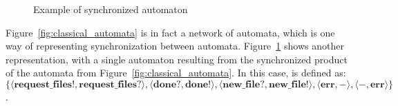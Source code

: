 \iffalse
\begin{definition}[Synchronized Automata Semantics]
A valid transition for $\automatasystem{}_s$ is then defined as:
$\automatanext{}(\langle \automatastate{}, \automataenvironment{}\rangle)
\triangleq \{\langle \automatastate{}', \automataenvironment{}'\rangle
|
   \existsin{\langle \automatastate{}, c, l, a, \automatastate{}' \rangle}{%
      \automatarelations{}_s}{%
      (\llbracket{}c\rrbracket_{\automataenvironment{}} = true)
      \land (\automataenvironment{}' = \llbracket{}a\rrbracket_{\automataenvironment{}})
      \land l \in \automatasyncconstraint{}
   }\}
$
\end{definition}
\fi
\begin{figure}[hbt!]
   \centering
   
   \caption{Example of synchronized automaton}
   \label{fig:classical_synchronized_automaton}
\end{figure}

\begin{example}
Figure~\ref{fig:classical_automata} is in fact a network of automata, which is
one way of representing synchronization between automata.
Figure~\ref{fig:classical_synchronized_automaton} shows another representation,
with a single automaton resulting from the synchronized product of the automata
from Figure~\ref{fig:classical_automata}. In this case,
\automatasyncconstraint{} is defined as:
$\{
   \langle \textbf{request\_files}!, \textbf{request\_files}? \rangle, \allowbreak{}
   \langle \textbf{done}?, \textbf{done}! \rangle, \allowbreak{}
   \langle \textbf{new\_file}?, \textbf{new\_file}! \rangle, \allowbreak{}
   \langle \textbf{err}, - \rangle, \allowbreak{}
   \langle -, \textbf{err} \rangle \allowbreak{}
\}$.
\end{example}

\stopallthesefloats{}
